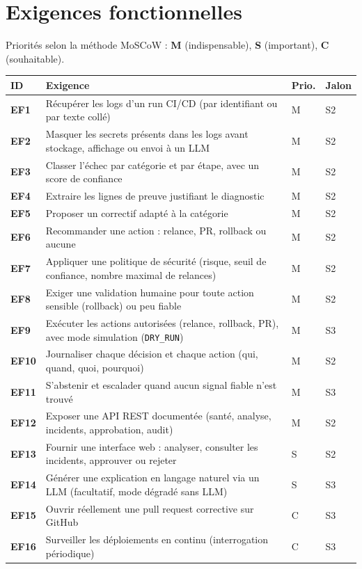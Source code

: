\documentclass[11pt,a4paper]{article}
\newcommand{\code}[1]{\texttt{#1}}
\begin{document}
\section{Exigences fonctionnelles}
Priorités selon la méthode MoSCoW : \textbf{M} (indispensable), \textbf{S} (important), \textbf{C} (souhaitable).
\begin{longtable}{>{\bfseries}p{1.2cm}p{9.6cm}p{1.2cm}p{1.5cm}}
\toprule
\textbf{ID} & \textbf{Exigence} & \textbf{Prio.} & \textbf{Jalon} \\
\midrule\endhead
EF1 & Récupérer les logs d'un run CI/CD (par identifiant ou par texte collé) & M & S2 \\
EF2 & Masquer les secrets présents dans les logs avant stockage, affichage ou envoi à un LLM & M & S2 \\
EF3 & Classer l'échec par catégorie et par étape, avec un score de confiance & M & S2 \\
EF4 & Extraire les lignes de preuve justifiant le diagnostic & M & S2 \\
EF5 & Proposer un correctif adapté à la catégorie & M & S2 \\
EF6 & Recommander une action : relance, PR, rollback ou aucune & M & S2 \\
EF7 & Appliquer une politique de sécurité (risque, seuil de confiance, nombre maximal de relances) & M & S2 \\
EF8 & Exiger une validation humaine pour toute action sensible (rollback) ou peu fiable & M & S2 \\
EF9 & Exécuter les actions autorisées (relance, rollback, PR), avec mode simulation (\code{DRY\_RUN}) & M & S3 \\
EF10 & Journaliser chaque décision et chaque action (qui, quand, quoi, pourquoi) & M & S2 \\
EF11 & S'abstenir et escalader quand aucun signal fiable n'est trouvé & M & S3 \\
EF12 & Exposer une API REST documentée (santé, analyse, incidents, approbation, audit) & M & S2 \\
EF13 & Fournir une interface web : analyser, consulter les incidents, approuver ou rejeter & S & S2 \\
EF14 & Générer une explication en langage naturel via un LLM (facultatif, mode dégradé sans LLM) & S & S3 \\
EF15 & Ouvrir réellement une pull request corrective sur GitHub & C & S3 \\
EF16 & Surveiller les déploiements en continu (interrogation périodique) & C & S3 \\
\bottomrule
\end{longtable}
\end{document}
